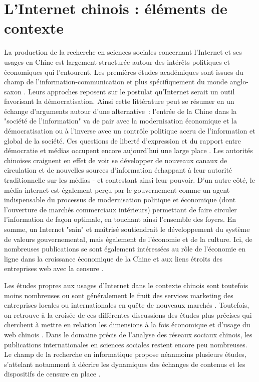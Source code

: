 \section{L’Internet chinois : éléments de contexte }
La production de la recherche en sciences sociales concernant l’Internet et ses usages en Chine est largement structurée autour des intérêts politiques et économiques qui l’entourent. Les premières études académiques sont issues du champ de l’information-communication et plus spécifiquement du monde anglo-saxon \citep{Johnson1996,Qiu2005}. Leurs approches reposent sur le postulat qu'Internet serait un outil favorisant la démocratisation. Ainsi cette littérature peut se résumer en un échange d'arguments autour d'une alternative : l'entrée de la Chine dans la "société de l'information" va de pair avec la modernisation économique et la démocratisation ou à l’inverse avec un contrôle politique accru de l'information et global de la société. Ces questions de liberté d’expression et du rapport entre démocratie et médias occupent encore aujourd’hui une large place \citep{MacKinnon2009, Douzet2007, Yang2008}. Les autorités chinoises craignent en effet de voir se développer de nouveaux canaux de circulation et de nouvelles sources d'information échappant à leur autorité traditionnelle sur les médias - et contestant ainsi leur pouvoir. D'un autre côté, le média internet est également perçu par le gouvernement comme un agent indispensable du processus de modernisation politique et économique (dont l’ouverture de marchés commerciaux intérieurs) permettant de faire circuler l’information de façon optimale, en touchant ainsi l’ensemble des foyers. En somme, un Internet "sain" et maîtrisé soutiendrait le développement du système de valeurs gouvernemental, mais également de l’économie et de la culture. Ici, de nombreuses publications se sont également intéressées au rôle de l’économie en ligne dans la croissance économique de la Chine et aux liens étroits des entreprises web avec la censure \citep{Dann2008}.

Les études propres aux usages d’Internet dans le contexte chinois sont toutefois moins nombreuses ou sont généralement le fruit des services marketing des entreprises locales ou internationales en quête de nouveaux marchés \citep{Hwang2005, Bergstrom2012}. Toutefois, on retrouve à la croisée de ces différentes discussions des études plus précises qui cherchent à mettre en relation les dimensions à la fois économique et d’usage du web chinois \citep{Puel2009, Fernandez2010}. Dans le domaine précis de l’analyse des réseaux sociaux chinois, les publications internationales en sciences sociales restent encore peu nombreuses. Le champ de la recherche en informatique propose néanmoins plusieurs études, s’attelant notamment à décrire les dynamiques des échanges de contenus \citep{Yu2011} et les dispositifs de censure en place \citep{MacKinnon2012}. 

